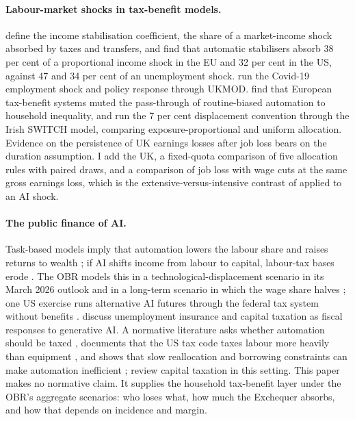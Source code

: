 \paragraph{Labour-market shocks in tax-benefit models.} \citet{dolls2012} define the income stabilisation coefficient, the share of a market-income shock absorbed by taxes and transfers, and find that automatic stabilisers absorb 38 per cent of a proportional income shock in the EU and 32 per cent in the US, against 47 and 34 per cent of an unemployment shock. \citet{brewer2021} run the Covid-19 employment shock and policy response through UKMOD. \citet{doorley2023automation} find that European tax-benefit systems muted the pass-through of routine-biased automation to household inequality, and \citet{doorley2026} run the 7 per cent displacement convention through the Irish SWITCH model, comparing exposure-proportional and uniform allocation. Evidence on the persistence of UK earnings losses after job loss \citep{upward2019} bears on the duration assumption. I add the UK, a fixed-quota comparison of five allocation rules with paired draws, and a comparison of job loss with wage cuts at the same gross earnings loss, which is the extensive-versus-intensive contrast of \citet{dolls2012} applied to an AI shock.

\paragraph{The public finance of AI.} Task-based models imply that automation lowers the labour share \citep{acemoglu2018} and raises returns to wealth \citep{moll2022}; if AI shifts income from labour to capital, labour-tax bases erode \citep{korinek2026}. The OBR models this in a technological-displacement scenario in its March 2026 outlook \citep{obr2026} and in a long-term scenario in which the wage share halves \citep{obr2026frs}; one US exercise runs alternative AI futures through the federal tax system without benefits \citep{iselin2026}. \citet{brollo2024} discuss unemployment insurance and capital taxation as fiscal responses to generative AI. A normative literature asks whether automation should be taxed \citep{guerreiro2022, costinot2023, thuemmel2023}, documents that the US tax code taxes labour more heavily than equipment \citep{acemoglu2020bpea}, and shows that slow reallocation and borrowing constraints can make automation inefficient \citep{beraja2025}; \citet{bastani2024} review capital taxation in this setting. This paper makes no normative claim. It supplies the household tax-benefit layer under the OBR's aggregate scenarios: who loses what, how much the Exchequer absorbs, and how that depends on incidence and margin.
